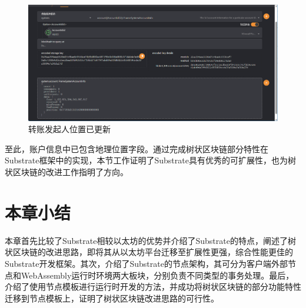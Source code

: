 \begin{figure}[htbp]
    \centering
    \includegraphics[width=\textwidth]{images/transWithPosResult.png}
    \caption{转账发起人位置已更新}\label{转账发起人位置已更新} %
\end{figure}

至此，账户信息中已包含地理位置字段。通过完成树状区块链部分特性在Substrate框架中的实现，本节工作证明了Substrate具有优秀的可扩展性，也为树状区块链的改进工作指明了方向。

\section{本章小结}

本章首先比较了Substrate相较以太坊的优势并介绍了Substrate的特点，阐述了树状区块链的改进思路，即将其从以太坊平台迁移至扩展性更强，综合性能更佳的Substrate开发框架。其次，介绍了Substrate的节点架构，其可分为客户端外部节点和WebAssembly运行时环境两大板块，分别负责不同类型的事务处理。最后，介绍了使用节点模板进行运行时开发的方法，并成功将树状区块链的部分功能特性迁移到节点模板上，证明了树状区块链改进思路的可行性。
